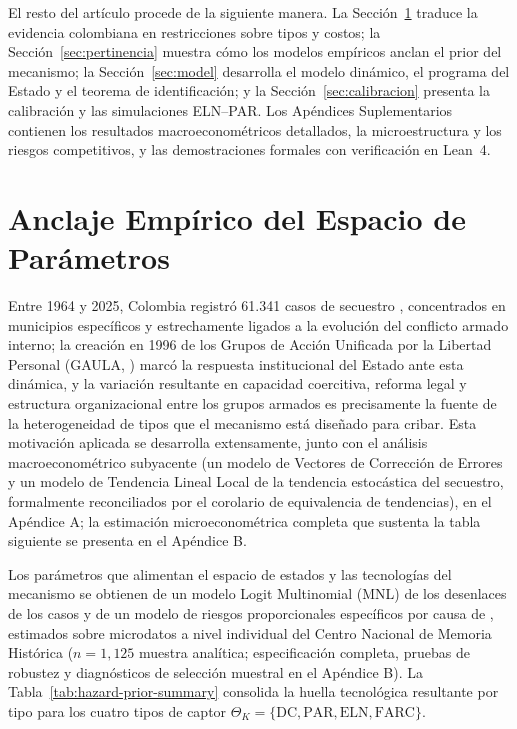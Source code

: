 \documentclass[review,authoryear,12pt]{elsarticle}
\theoremstyle{plain}
\theoremstyle{definition}
\newcommand{\ThetaK}{\Theta_K}
\newcommand{\1}{\mathbf{1}}
\begin{document}
El resto del artículo procede de la siguiente manera. La Sección~\ref{sec:institutional} traduce la evidencia colombiana en restricciones sobre tipos y costos; la Sección~\ref{sec:pertinencia} muestra cómo los modelos empíricos anclan el prior del mecanismo; la Sección~\ref{sec:model} desarrolla el modelo dinámico, el programa del Estado y el teorema de identificación; y la Sección~\ref{sec:calibracion} presenta la calibración y las simulaciones ELN--PAR. Los Apéndices Suplementarios contienen los resultados macroeconométricos detallados, la microestructura y los riesgos competitivos, y las demostraciones formales con verificación en Lean~4.


\section{Anclaje Empírico del Espacio de Parámetros}\label{sec:institutional}

Entre 1964 y 2025, Colombia registró 61.341 casos de secuestro \citep{cnmh_datos}, concentrados en municipios específicos y estrechamente ligados a la evolución del conflicto armado interno; la creación en 1996 de los Grupos de Acción Unificada por la Libertad Personal (GAULA, \citealt{ley282_1996}) marcó la respuesta institucional del Estado ante esta dinámica, y la variación resultante en capacidad coercitiva, reforma legal y estructura organizacional entre los grupos armados es precisamente la fuente de la heterogeneidad de tipos que el mecanismo está diseñado para cribar. Esta motivación aplicada se desarrolla extensamente, junto con el análisis macroeconométrico subyacente (un modelo de Vectores de Corrección de Errores y un modelo de Tendencia Lineal Local de la tendencia estocástica del secuestro, formalmente reconciliados por el corolario de equivalencia de tendencias), en el Apéndice A; la estimación microeconométrica completa que sustenta la tabla siguiente se presenta en el Apéndice B.

Los parámetros que alimentan el espacio de estados y las tecnologías del mecanismo se obtienen de un modelo Logit Multinomial (MNL) de los desenlaces de los casos y de un modelo de riesgos proporcionales específicos por causa de \citet{Cox1972}, estimados sobre microdatos a nivel individual del Centro Nacional de Memoria Histórica \citep{cnmh_datos} ($n=1{,}125$ muestra analítica; especificación completa, pruebas de robustez y diagnósticos de selección muestral en el Apéndice B). La Tabla~\ref{tab:hazard-prior-summary} consolida la huella tecnológica resultante por tipo para los cuatro tipos de captor $\ThetaK=\{\text{DC},\text{PAR},\text{ELN},\text{FARC}\}$.
\end{document}
